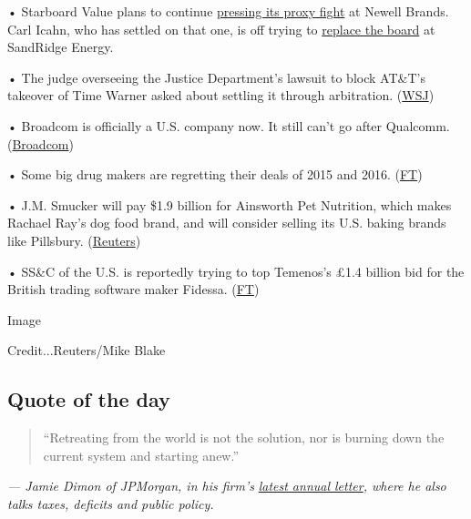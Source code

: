 • Starboard Value plans to continue
\href{https://www.wsj.com/articles/starboard-pursuing-proxy-fight-at-newell-brands-despite-deal-with-icahn-1522866118?dlbk}{pressing
its proxy fight} at Newell Brands. Carl Icahn, who has settled on that
one, is off trying to
\href{https://www.wsj.com/articles/carl-icahn-to-push-for-full-board-refresh-at-sandridge-1522884571?dlbk}{replace
the board} at SandRidge Energy.

• The judge overseeing the Justice Department's lawsuit to block AT\&T's
takeover of Time Warner asked about settling it through arbitration.
(\href{https://www.wsj.com/articles/arbitration-questioned-for-u-s-challenge-of-at-t-bid-for-time-warner-1522870327?dlbk}{WSJ})

• Broadcom is officially a U.S. company now. It still can't go after
Qualcomm.
(\href{https://www.prnewswire.com/news-releases/broadcom-completes-redomiciliation-to-the-united-states-300624646.html?dlbk}{Broadcom})

• Some big drug makers are regretting their deals of 2015 and 2016.
(\href{https://www.ft.com/content/1393a7f6-339d-11e8-ac48-10c6fdc22f03?dlbk}{FT})

• J.M. Smucker will pay \$1.9 billion for Ainsworth Pet Nutrition, which
makes Rachael Ray's dog food brand, and will consider selling its U.S.
baking brands like Pillsbury.
(\href{https://www.reuters.com/article/us-ainsworthpet-m-a-smucker/j-m-smucker-to-buy-ainsworth-pet-nutrition-for-1-9-billion-idUSKCN1HB2YG?dlbk}{Reuters})

• SS\&C of the U.S. is reportedly trying to top Temenos's £1.4 billion
bid for the British trading software maker Fidessa.
(\href{https://www.ft.com/content/94c7c1d8-3828-11e8-8b98-2f31af407cc8?dlbk}{FT})

Image

Credit...Reuters/Mike Blake

\hypertarget{quote-of-the-day}{%
\subsection{Quote of the day}\label{quote-of-the-day}}

\begin{quote}
``Retreating from the world is not the solution, nor is burning down the
current system and starting anew.''
\end{quote}

\emph{--- Jamie Dimon of JPMorgan, in his firm's}
\href{https://reports.jpmorganchase.com/investor-relations/2017/ar-ceo-letters.htm?dlbk}{\emph{latest
annual letter}}\emph{, where he also talks taxes, deficits and public
policy.}

